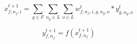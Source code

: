 \documentclass{article}
\begin{document}
$$x_{f, n_f, i}^{t+1} = \sum_{g \in F} \sum_{n_g \in L} \sum_{o \in L} w_{f, n_f, i, g, n_g, o}^t * y_{g, n_g, o}^t$$


$$y_{f, n_f}^{t+1} = f(x_{f, n_f}^{t+1})$$









\end{document}
